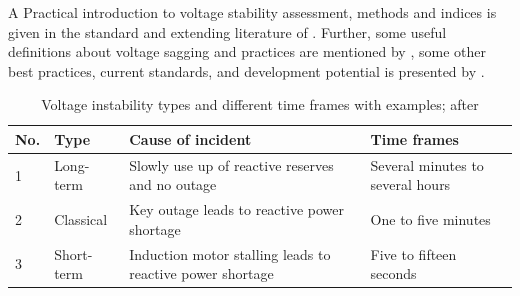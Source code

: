 A Practical introduction to voltage stability assessment, methods and indices is given in the standard and extending literature of \textcite{danish_2015,cutsem_1998}. Further, some useful definitions about voltage sagging and practices are mentioned by \textcite{shoup_2004}, some other best practices, current standards, and development potential is presented by \textcite{rueda-torres_2024}.

      
\begin{table}
    \centering
    \caption[Voltage instability types and different time frames]{Voltage instability types and different time frames with examples; after \quelle}
    \small
    \renewcommand\tabularxcolumn[1]{m{#1}}
    \vspace*{12pt}
    \begin{tabularx}{\textwidth}{llXX}
        \textbf{No.} & \textbf{Type} & \textbf{Cause of incident} & \textbf{Time frames} \\
        \toprule
        1 & Long-term & Slowly use up of reactive reserves and no outage & Several minutes to several hours \\
        2 & Classical & Key outage leads to reactive power shortage & One to five minutes \\
        3 & Short-term & Induction motor stalling leads to reactive power shortage & Five to fifteen seconds \\
        \bottomrule
    \end{tabularx}
\end{table}

